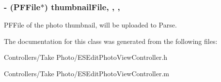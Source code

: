 \subsubsection[{thumbnail\+File}]{\setlength{\rightskip}{0pt plus 5cm}-\/ (P\+F\+File$\ast$) thumbnail\+File\hspace{0.3cm}{\ttfamily [read]}, {\ttfamily [write]}, {\ttfamily [nonatomic]}, {\ttfamily [strong]}}\label{interface_e_s_edit_photo_view_controller_a4fbd79755e22d14ea6d3e3ae87866792}
P\+F\+File of the photo thumbnail, will be uploaded to Parse. 

The documentation for this class was generated from the following files\+:\begin{DoxyCompactItemize}
\item 
Controllers/\+Take Photo/E\+S\+Edit\+Photo\+View\+Controller.\+h\item 
Controllers/\+Take Photo/E\+S\+Edit\+Photo\+View\+Controller.\+m\end{DoxyCompactItemize}
